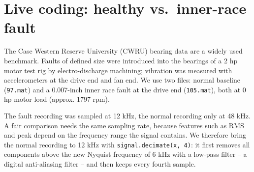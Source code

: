 \documentclass[
  letterpaper,
  DIV=11,
  numbers=noendperiod]{scrreprt}
\begin{document}
\section{Live coding: healthy vs.~inner-race
fault}\label{live-coding-healthy-vs.-inner-race-fault}

The Case Western Reserve University (CWRU) bearing data are a widely
used benchmark. Faults of defined size were introduced into the bearings
of a 2 hp motor test rig by electro-discharge machining; vibration was
measured with accelerometers at the drive end and fan end. We use two
files: normal baseline (\texttt{97.mat}) and a 0.007-inch inner race
fault at the drive end (\texttt{105.mat}), both at 0 hp motor load
(approx. 1797 rpm).

The fault recording was sampled at 12 kHz, the normal recording only at
48 kHz. A fair comparison needs the same sampling rate, because features
such as RMS and peak depend on the frequency range the signal contains.
We therefore bring the normal recording to 12 kHz with
\texttt{signal.decimate(x,\ 4)}: it first removes all components above
the new Nyquist frequency of 6 kHz with a low-pass filter -- a digital
anti-aliasing filter -- and then keeps every fourth sample.
\end{document}
